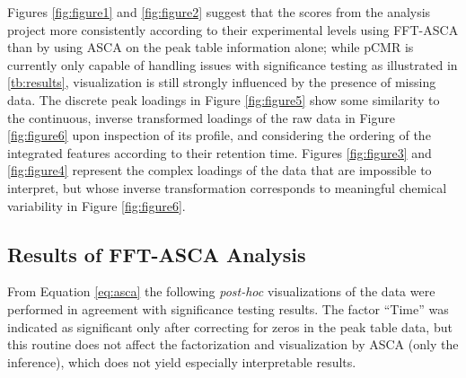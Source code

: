 \documentclass[preprint,12pt]{elsarticle}
\begin{document}
Figures \ref{fig:figure1} and \ref{fig:figure2} suggest that the scores from the analysis project more consistently according to their experimental levels using FFT-ASCA than by using ASCA on the peak table information alone; while pCMR is currently only capable of handling issues with significance testing as illustrated in \ref{tb:results}, visualization is still strongly influenced by the presence of missing data. The discrete peak loadings in Figure \ref{fig:figure5} show some similarity to the continuous, inverse transformed loadings of the raw data in Figure \ref{fig:figure6} upon inspection of its profile, and considering the ordering of the integrated features according to their retention time. Figures \ref{fig:figure3} and \ref{fig:figure4} represent the complex loadings of the data that are impossible to interpret, but whose inverse transformation corresponds to meaningful chemical variability in Figure \ref{fig:figure6}.

\subsection{Results of FFT-ASCA Analysis}

From Equation \ref{eq:asca} the following \textit{post-hoc} visualizations of the data were performed in agreement with significance testing results. The factor ``Time'' was indicated as significant only after correcting for zeros in the peak table data, but this routine does not affect the factorization and visualization by ASCA (only the inference), which does not yield especially interpretable results. 
\end{document}
